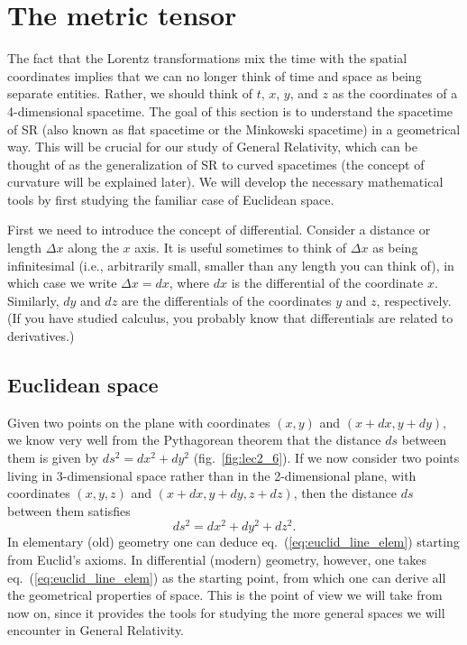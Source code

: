 \section{The metric tensor}

The fact that the Lorentz transformations mix the time with the spatial coordinates implies that we can no longer think of time and space as being separate entities. Rather, we should think of $t$, $x$, $y$, and $z$ as the coordinates of a 4-dimensional spacetime. The goal of this section is to understand the spacetime of SR (also known as flat spacetime or the Minkowski spacetime) in a geometrical way. This will be crucial for our study of General Relativity, which can be thought of as the generalization of SR to curved spacetimes (the concept of curvature will be explained later). We will develop the necessary mathematical tools by first studying the familiar case of Euclidean space.

First we need to introduce the concept of differential. Consider a distance or length $\Delta x$ along the $x$ axis. It is useful sometimes to think of $\Delta x$ as being infinitesimal (i.e., arbitrarily small, smaller than any length you can think of), in which case we write $\Delta x=dx$, where $dx$ is the differential of the coordinate $x$. Similarly, $dy$ and $dz$ are the differentials of the coordinates $y$ and $z$, respectively. (If you have studied calculus, you probably know that differentials are related to derivatives.)

\subsection{Euclidean space}

Given two points on the plane with coordinates $(x,y)$ and $(x+dx,y+dy)$, we know very well from the Pythagorean theorem that the distance $ds$ between them is given by $ds^2=dx^2+dy^2$ (fig.\ \ref{fig:lec2_6}). If we now consider two points living in 3-dimensional space rather than in the 2-dimensional plane, with coordinates $(x,y,z)$ and $(x+dx,y+dy,z+dz)$, then the distance $ds$ between them satisfies
\begin{equation} \label{eq:euclid_line_elem}
ds^2=dx^2+dy^2+dz^2.
\end{equation}
In elementary (old) geometry one can deduce eq.\ (\ref{eq:euclid_line_elem}) starting from Euclid's axioms. In differential (modern) geometry, however, one takes eq.\ (\ref{eq:euclid_line_elem}) as the starting point, from which one can derive all the geometrical properties of space. This is the point of view we will take from now on, since it provides the tools for studying the more general spaces we will encounter in General Relativity.

